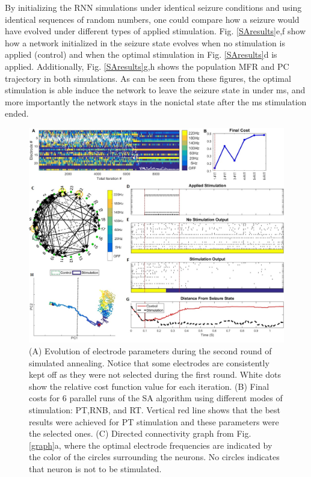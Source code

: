 \documentclass[11pt,a4paper,final]{article}
\begin{document}
By initializing the RNN simulations under identical seizure conditions and using identical sequences of random numbers, one could compare how a seizure would have evolved under different types of applied stimulation.
Fig. \ref{SAresults}e,f show how a network initialized in the seizure state evolves when no stimulation is applied (control) and when the optimal stimulation in Fig. \ref{SAresults}d is applied.
Additionally, Fig. \ref{SAresults}g,h shows the population MFR and PC trajectory in both simulations.
As can be seen from these figures, the optimal stimulation is able induce the network to leave the seizure state in under \len{} ms, and more importantly the network stays in the nonictal state after the \len{} ms stimulation ended.

\begin{figure}[!ht]
	\centering
	\includegraphics[width=160mm]{SAresults}
	\caption[Simulated Annealing Results]{
		(A) Evolution of electrode parameters during the second round of simulated annealing. Notice that some electrodes are consistently kept off as they were not selected during the first round. White dots show the relative cost function value for each iteration. 
		(B) Final costs for 6 parallel runs of the SA algorithm using different modes of stimulation: PT,RNB, and RT. Vertical red line shows that the best results were achieved for PT stimulation and these parameters were the selected ones.	
		(C) Directed connectivity graph from Fig. \ref{graph}a, where the optimal electrode frequencies are indicated by the color of the circles surrounding the neurons. No circles indicates that neuron is not to be stimulated.
}
\end{figure}
\end{document}
